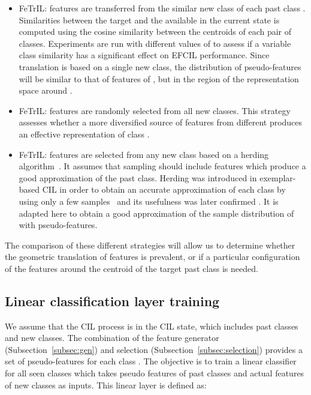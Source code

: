 \documentclass[10pt,twocolumn,letterpaper]{article}
\newcommand{\ourmodelNospace}{FeTrIL}
\begin{document}
\begin{itemize}[nosep,leftmargin=*]
    \item \ourmodelNospace:  features are transferred from the  similar new class of each past class . Similarities between the target  and the  available in the current state is computed using the cosine similarity between the centroids of each pair of classes.  Experiments are run with different values of  to assess if a variable class similarity has a significant effect on EFCIL performance. Since translation is based on a single new class, the distribution of pseudo-features will be similar to that of features of , but in the region of the representation space around . 
    \item \ourmodelNospace:  features are randomly selected from all new classes. This strategy assesses whether a more diversified source of features from different  produces an effective representation of class . 
    \item \ourmodelNospace:  features are selected from any new class based on a herding algorithm~\cite{max2009_herding}. It assumes that sampling should include features which produce a good approximation of the past class. Herding was introduced in exemplar-based CIL in order to obtain an accurate approximation of each class by using only a few samples~\cite{rebuffi2017_icarl} and its usefulness was later confirmed \cite{belouadah2021_study,hou2019_lucir,wu2019_bic}. It is adapted here to obtain a good approximation of the sample distribution of  with  pseudo-features.
\end{itemize}

The comparison of these different strategies will allow us to determine whether the geometric translation of features is prevalent, or if a particular configuration of the features around the centroid of the target past class is needed. 

\subsection{Linear classification layer training}
\label{subsec:layer}
We assume that the CIL process is in the  CIL state, which includes  past classes and  new classes.
The combination of the feature generator (Subsection~\ref{subsec:gen}) and selection (Subsection~\ref{subsec:selection}) provides a set  of  pseudo-features for each class . 
The objective is to train a linear classifier for all  seen classes which takes pseudo features of past classes and actual features of new classes as inputs.
This linear layer is defined as:
\end{document}
